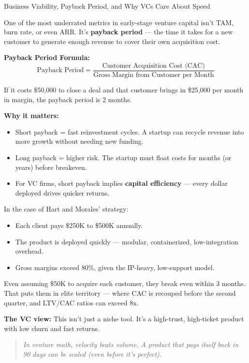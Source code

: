 \begin{TechnicalSidebar}{Business Viability, Payback Period, and Why VCs Care About Speed}

  One of the most underrated metrics in early-stage venture capital isn’t TAM, burn rate, or even ARR.  
  It’s \textbf{payback period} — the time it takes for a new customer to generate enough revenue to cover their own acquisition cost.
  
  \medskip
  
  \textbf{Payback Period Formula:}
  \[
  \text{Payback Period} = \frac{\text{Customer Acquisition Cost (CAC)}}{\text{Gross Margin from Customer per Month}}
  \]
  
  \medskip
  
  If it costs \$50,000 to close a deal and that customer brings in \$25,000 per month in margin,  
  the payback period is 2 months.
  
  \medskip
  
  \textbf{Why it matters:}
  
  \begin{itemize}
    \item Short payback = fast reinvestment cycles. A startup can recycle revenue into more growth without needing new funding.
    \item Long payback = higher risk. The startup must float costs for months (or years) before breakeven.
    \item For VC firms, short payback implies \textbf{capital efficiency} — every dollar deployed drives quicker returns.
  \end{itemize}
  
  \medskip
  
  In the case of Hart and Morales’ strategy:

  \medskip
  
  \begin{itemize}
    \item Each client pays \$250K to \$500K annually.
    \item The product is deployed quickly — modular, containerized, low-integration overhead.
    \item Gross margins exceed 80\%, given the IP-heavy, low-support model.
  \end{itemize}
  
  \medskip
  
  Even assuming \$50K to acquire each customer, they break even within 3 months.  
  That puts them in elite territory — where CAC is recouped before the second quarter, and LTV/CAC ratios can exceed 8x.
  
  \medskip
  
  \textbf{The VC view:}  
  This isn’t just a niche tool. It’s a high-trust, high-ticket product with low churn and fast returns.
  
  \begin{quote}
  \textit{In venture math, velocity beats volume.  
  A product that pays itself back in 90 days can be scaled   
  (even before it's perfect).}
  \end{quote}
  
\end{TechnicalSidebar}
  

